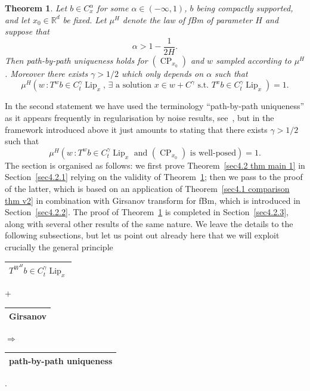 \documentclass[10pt]{article}
\newcommand{\tmop}[1]{\ensuremath{\operatorname{#1}}}
\newtheorem{theorem}{Theorem}
\begin{document}
\begin{theorem}
  \label{sec4.2 thm main 2}Let $b \in C^{\alpha}_x$ for some $\alpha \in (-
  \infty, 1)$, $b$ being compactly supported, and let $x_0 \in \mathbb{R}^d$
  be fixed. Let $\mu^H$ denote the law of fBm of parameter $H$ and suppose
  that
  \[ \alpha > 1 - \frac{1}{2 H} . \]
  Then path\mbox{-}by\mbox{-}path uniqueness holds for $(\tmop{CP}_{x_0})$ and
  $w$ sampled according to $\mu^H$. Moreover there exists $\gamma > 1 / 2$
  which only depends on $\alpha$ such that
  \[ \mu^H \left( w \, : T^w b \in C^{\gamma}_t \tmop{Lip}_x, \,\exists \text{ a solution $x \in w + C^{\gamma}$ s.t. } T^x b \in C^{\gamma}_t
     \tmop{Lip}_x \right) = 1. \]
\end{theorem}

In the second statement we have used the terminology
``path\mbox{-}by\mbox{-}path uniqueness'' as it appears frequently in
regularisation by noise results, see~{\cite{flandoli}}, but in the framework
introduced above it just amounts to stating that there exists $\gamma > 1 / 2$
such that
\[ \mu^H \left( w \, : T^w b \in C^{\gamma}_t \tmop{Lip}_x \text{ and
   $(\tmop{CP}_{x_0})$ is well-posed} \right) = 1. \]
The section is organised as follows: we first prove Theorem~\ref{sec4.2 thm
main 1} in Section~\ref{sec4.2.1} relying on the validity of
Theorem~\ref{sec4.2 thm main 2}; then we pass to the proof of the latter,
which is based on an application of Theorem~\ref{sec4.1 comparison thm v2} in
combination with Girsanov transform for fBm, which is introduced in
Section~\ref{sec4.2.2}. The proof of Theorem~\ref{sec4.2 thm main 2} is
completed in Section~\ref{sec4.2.3}, along with several other results of the
same nature. We leave the details to the following subsections, but let us
point out already here that we will exploit crucially the general principle

\begin{center}
  \begin{tabular}{|l|}
    \hline
    $T^{W^H} b \in C^{\gamma}_t \tmop{Lip}_x$\\
    \hline
  \end{tabular}\enspace +\enspace\begin{tabular}{|l|}
    \hline
    Girsanov\\
    \hline
  \end{tabular}\enspace$\Longrightarrow$\enspace\begin{tabular}{|l|}
    \hline
    path-by-path uniqueness\\
    \hline
  \end{tabular}.
\end{center}
\end{document}
